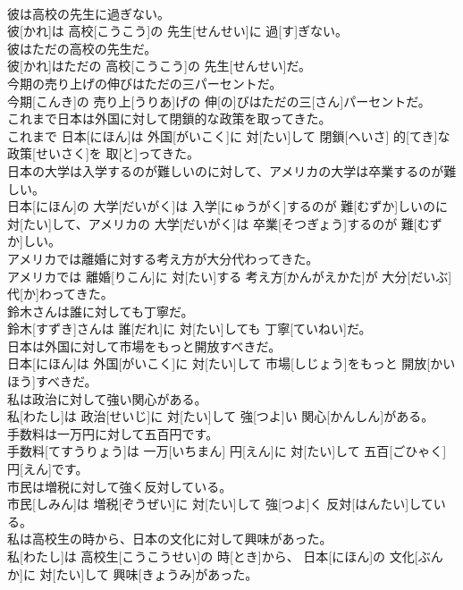 \documentclass[8pt]{extreport}
\begin{document}
\begin{CJK}{UTF8}{min}
\\	彼は高校の先生に過ぎない。	
\\	彼[かれ]は 高校[こうこう]の 先生[せんせい]に 過[す]ぎない。
\\	彼はただの高校の先生だ。	
\\	彼[かれ]はただの 高校[こうこう]の 先生[せんせい]だ。
\\	今期の売り上げの伸びはただの三パーセントだ。	
\\	今期[こんき]の 売り上[うりあ]げの 伸[の]びはただの三[さん]パーセントだ。
\\	これまで日本は外国に対して閉鎖的な政策を取ってきた。	
\\	これまで 日本[にほん]は 外国[がいこく]に 対[たい]して 閉鎖[へいさ] 的[てき]な 政策[せいさく]を 取[と]ってきた。
\\	日本の大学は入学するのが難しいのに対して、アメリカの大学は卒業するのが難しい。	
\\	日本[にほん]の 大学[だいがく]は 入学[にゅうがく]するのが 難[むずか]しいのに 対[たい]して、アメリカの 大学[だいがく]は 卒業[そつぎょう]するのが 難[むずか]しい。
\\	アメリカでは離婚に対する考え方が大分代わってきた。	
\\	アメリカでは 離婚[りこん]に 対[たい]する 考え方[かんがえかた]が 大分[だいぶ] 代[か]わってきた。
\\	鈴木さんは誰に対しても丁寧だ。	
\\	鈴木[すずき]さんは 誰[だれ]に 対[たい]しても 丁寧[ていねい]だ。
\\	日本は外国に対して市場をもっと開放すべきだ。	
\\	日本[にほん]は 外国[がいこく]に 対[たい]して 市場[しじょう]をもっと 開放[かいほう]すべきだ。
\\	私は政治に対して強い関心がある。	
\\	私[わたし]は 政治[せいじ]に 対[たい]して 強[つよ]い 関心[かんしん]がある。
\\	手数料は一万円に対して五百円です。	
\\	手数料[てすうりょう]は 一万[いちまん] 円[えん]に 対[たい]して 五百[ごひゃく] 円[えん]です。
\\	市民は増税に対して強く反対している。	
\\	市民[しみん]は 増税[ぞうぜい]に 対[たい]して 強[つよ]く 反対[はんたい]している。
\\	私は高校生の時から、日本の文化に対して興味があった。	
\\	私[わたし]は 高校生[こうこうせい]の 時[とき]から、 日本[にほん]の 文化[ぶんか]に 対[たい]して 興味[きょうみ]があった。

\end{CJK}
\end{document}
